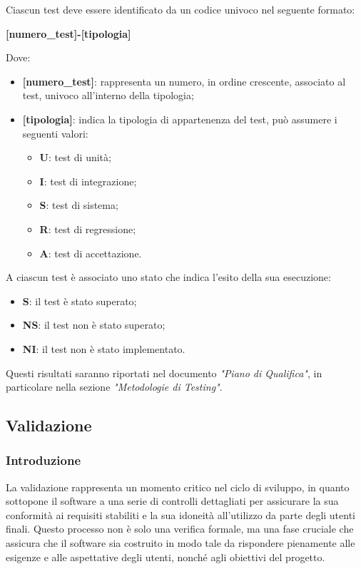 Ciascun test deve essere identificato da un codice univoco nel seguente formato:
\begin{center}
	\textbf{[numero\_test]-[tipologia]}
\end{center}
Dove:
\begin{itemize}
	\item \textbf{[numero\_test]}: rappresenta un numero, in ordine crescente, associato al test, univoco all'interno della tipologia;
	\item \textbf{[tipologia]}: indica la tipologia di appartenenza del test, può assumere i seguenti valori:
		\begin{itemize}
			\item \textbf{U}: test di unità;
			\item \textbf{I}: test di integrazione;
			\item \textbf{S}: test di sistema;
			\item \textbf{R}: test di regressione;
			\item \textbf{A}: test di accettazione.
		\end{itemize}
	
\end{itemize}

A ciascun test è associato uno stato che indica l'esito della sua esecuzione:
\begin{itemize}
	\item \textbf{S}: il test è stato superato;
	\item \textbf{NS}: il test non è stato superato;
	\item \textbf{NI}: il test non è stato implementato.
\end{itemize}
Questi risultati saranno riportati nel documento \textit{"Piano di Qualifica"}, in particolare nella sezione \textit{"Metodologie di Testing"}.

\subsection{Validazione}
\subsubsection{Introduzione}
La validazione rappresenta un momento critico nel ciclo di sviluppo, in quanto sottopone il software a una serie di controlli dettagliati per assicurare la sua conformità ai requisiti stabiliti e la sua idoneità all'utilizzo da parte degli utenti finali. Questo processo non è solo una verifica formale, ma una fase cruciale che assicura che il software sia costruito in modo tale da rispondere pienamente alle esigenze e alle aspettative degli utenti, nonché agli obiettivi del progetto.

